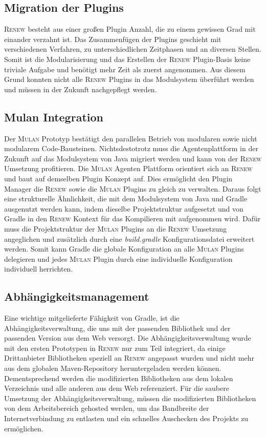  \subsection{Migration der Plugins}
	\textsc{Renew} besteht aus einer großen Plugin Anzahl, die zu einem gewissen Grad mit einander verzahnt ist. Das  Zusammenfügen der Plugins geschieht mit verschiedenen Verfahren, zu unterschiedlichen Zeitphasen und an diversen Stellen. Somit ist die Modularisierung und das Erstellen der \textsc{Renew} Plugin-Basis keine triviale Aufgabe und benötigt mehr Zeit als zuerst angenommen. Aus diesem Grund konnten nicht alle \textsc{Renew} Plugins in das Modulsystem überführt werden und müssen in der Zukunft nachgepflegt werden. 

 \subsection{Mulan Integration}
	Der \textsc{Mulan} Prototyp bestätigt den parallelen Betrieb von modularen sowie nicht modularem Code-Bausteinen. Nichtsdestotrotz muss die Agentenplattform in der Zukunft auf das Modulsystem von Java migriert werden und kann von der \textsc{Renew} Umsetzung profitieren.\newline 
	Die \textsc{Mulan} Agenten Plattform orientiert sich an \textsc{Renew} und baut auf demselben Plugin Konzept auf. Dies ermöglicht den Plugin Manager die \textsc{Renew} sowie die \textsc{Mulan} Plugins zu gleich zu verwalten. Daraus folgt eine strukturelle Ähnlichkeit, die mit dem Modulsystem von Java und Gradle ausgenutzt werden kann, indem dieselbe Projektstruktur aufgesetzt und von Gradle in den \textsc{Renew} Kontext für das Kompilieren mit aufgenommen wird.\newline
	Dafür muss die Projektstruktur der \textsc{Mulan} Plugins an die \textsc{Renew} Umsetzung angeglichen und zusätzlich durch eine \textit{build.gradle} Konfigurationsdatei erweitert werden. Somit kann Gradle die globale Konfiguration an alle \textsc{Mulan} Plugins delegieren und jedes \textsc{Mulan} Plugin durch eine individuelle Konfiguration individuell herrichten. 
		
 \subsection{Abhängigkeitsmanagement}
	Eine wichtige mitgelieferte Fähigkeit von Gradle, ist die Abhängigkeitsverwaltung, die uns mit der passenden Bibliothek und der passenden Version aus dem Web versorgt. Die Abhängigkeitsverwaltung wurde mit den ersten Prototypen in \textsc{Renew} nur zum Teil integriert, da einige Drittanbieter Bibliotheken speziell an \textsc{Renew} angepasst wurden und nicht mehr aus dem globalen Maven-Repository heruntergeladen werden können. Dementsprechend werden die modifizierten Bibliotheken aus dem lokalen Verzeichnis und alle anderen aus dem Web referenziert.\newline
	Für die saubere Umsetzung der Abhängigkeitsverwaltung, müssen die modifizierten Bibliotheken von dem Arbeitsbereich gehosted werden, um das Bandbreite der Internetverbindung zu entlasten und ein schnelles Auschecken des Projekts zu ermöglichen. 	
	
